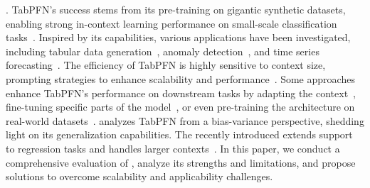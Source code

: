 .
TabPFN’s success stems from its pre-training on gigantic synthetic datasets, enabling strong in-context learning performance on small-scale classification tasks~\cite{Hollmann2022TabPFN}. Inspired by its capabilities, various applications have been investigated, including tabular data generation~\cite{Ma2024TabPFGen}, anomaly detection~\cite{RuizVillafrancaGGMM24detection}, and time series forecasting~\cite{Shi2024TabPFNSeries}. The efficiency of TabPFN is highly sensitive to context size, prompting strategies to enhance scalability and performance~\cite{Feuer2023ScalePFN, Xu2024MixPFN}. Some approaches enhance TabPFN’s performance on downstream tasks by adapting the context~\cite{Thomas2024LocalPFN}, fine-tuning specific parts of the model~\cite{Feuer2024TuneTables,liu2025tabpfnunleashedscalableeffective}, or even pre-training the architecture on real-world datasets~\citep{Ma2024TabDPT}. 
\citet{Nagler2023Statistical} analyzes TabPFN from a bias-variance perspective, shedding light on its generalization capabilities. The recently introduced \ours extends support to regression tasks and handles larger contexts~\cite{hollmann2025TabPFNv2}. In this paper, we conduct a comprehensive evaluation of \ours, analyze its strengths and limitations, and propose solutions to overcome scalability and applicability challenges.